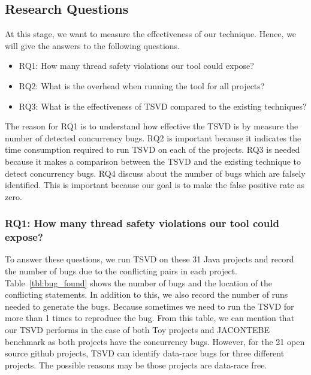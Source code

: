 \subsection{Research Questions}
At this stage, we want to measure the effectiveness of our technique. Hence, we will give the answers to the following questions.
\begin{itemize}
	\item RQ1:  How many thread safety violations our tool could expose?
	\item RQ2:  What is the overhead when running the tool for all projects?
	\item RQ3:  What is the effectiveness of TSVD compared to the existing techniques?
\end{itemize}
The reason for RQ1 is to understand how effective the TSVD is by measure the
number of detected concurrency bugs.  RQ2 is important because it indicates the
time consumption required to run TSVD on each of the projects. RQ3 is needed
because it makes a comparison between the TSVD and the existing technique to
detect concurrency bugs.  RQ4 discuss about the number of bugs which are
falsely identified. This is important because our goal is to make the false
positive rate as zero.  




\subsubsection{RQ1: How many thread safety violations our tool could expose?}
\label{sec:eval:rq1}

To answer these questions, we run TSVD on these 31 Java projects and record the
number of bugs due to the conflicting pairs in each project. Table~\ref{tbl:bug_found} shows
the number of bugs and the location of the conflicting statements. In addition
to this, we also record the number of runs needed to generate the bugs. Because
sometimes we need to run the TSVD for more than 1 times to reproduce the bug.
From this table, we can mention that our TSVD performs  in the case of both Toy
projects and JACONTEBE benchmark as both projects have the concurrency bugs.
However, for the 21 open source github projects, TSVD can identify data-race
bugs for three different projects. The possible reasons may be those projects
are data-race free. 

